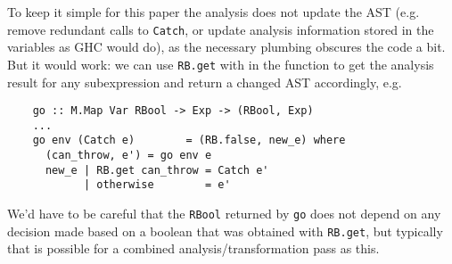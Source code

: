 \documentclass[manuscript,screen,acmsmall]{acmart}
\begin{document}
To keep it simple for this paper the analysis does not update the AST (e.g. remove redundant calls to \verb|Catch|, or update analysis information stored in the variables as GHC would do), as the necessary plumbing obscures the code a bit. But it would work: we can use \verb|RB.get|  with in the function to get the analysis result for any subexpression and return a changed AST accordingly, e.g.
\begin{verbatim}
    go :: M.Map Var RBool -> Exp -> (RBool, Exp)
    ...
    go env (Catch e)        = (RB.false, new_e) where
      (can_throw, e') = go env e
      new_e | RB.get can_throw = Catch e'
            | otherwise        = e'
\end{verbatim}
We'd have to be careful that the \verb|RBool| returned by \verb|go| does not depend on any decision made based on a boolean that was obtained with \verb|RB.get|, but typically that is possible for a combined analysis/transformation pass as this.
\end{document}
